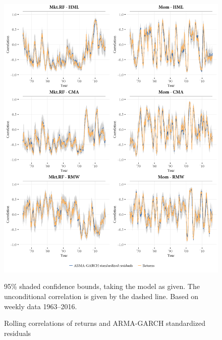 \begin{figure}[!ht]
  \centering
  \footnotesize
  \includegraphics[scale=1]{graphics/appendix_rolling1.png}
  
  \caption{Rolling correlations of returns and ARMA-GARCH standardized residuals}
  \begin{longcaption}
    95\% shaded confidence bounds, taking the model as given. The unconditional correlation is given by the dashed line. Based on weekly data 1963--2016.
  \end{longcaption}
  \label{fig:appendix_rolling1}
\end{figure}
